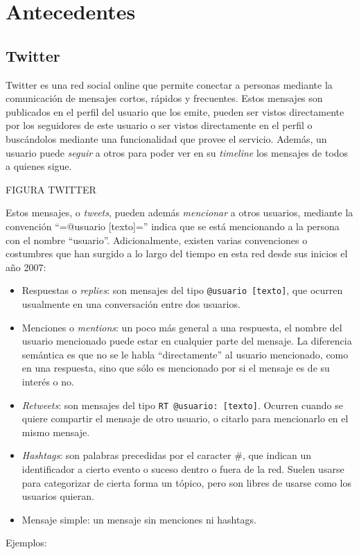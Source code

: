 \chapter{Antecedentes}
\label{sec-2}

\section{Twitter}
\label{sec-2.1}

Twitter es una red social online que permite conectar a
personas mediante la comunicación de mensajes cortos, rápidos y frecuentes. Estos
mensajes son publicados en el perfil del usuario que los emite, pueden
ser vistos directamente por los seguidores de este usuario o ser
vistos directamente en el perfil o buscándolos mediante una
funcionalidad que provee el servicio. Además, un usuario puede
\emph{seguir} a otros para poder ver en su \emph{timeline} los mensajes de todos
a quienes sigue.

FIGURA TWITTER

Estos mensajes, o \emph{tweets}, pueden además \emph{mencionar} a otros
usuarios, mediante la convención ``=@usuario [texto]='' indica que
se está mencionando a la persona con el nombre ``usuario''. Adicionalmente,
existen varias convenciones o costumbres que han surgido a lo largo
del tiempo en esta red desde sus inicios el año 2007:


\begin{itemize}
\item Respuestas o \emph{replies}: son mensajes del tipo \texttt{@usuario [texto]},
  que ocurren usualmente en una conversación entre dos usuarios.
\item Menciones o \emph{mentions}: un poco más general a una respuesta, el
  nombre del usuario mencionado puede estar en cualquier parte del
  mensaje. La diferencia semántica es que no se le habla
  ``directamente'' al usuario mencionado, como en una respuesta, sino
  que sólo es mencionado por si el mensaje es de su interés o no.
\item \emph{Retweets}: son mensajes del tipo \texttt{RT @usuario: [texto]}. Ocurren
  cuando se quiere compartir el mensaje de otro usuario, o citarlo
  para mencionarlo en el mismo mensaje.
\item \emph{Hashtags}: son palabras precedidas por el caracter \#, que indican
  un identificador a cierto evento o suceso dentro o fuera de la
  red. Suelen usarse para categorizar de cierta forma un tópico, pero
  son libres de usarse como los usuarios quieran.
\item Mensaje simple: un mensaje sin menciones ni hashtags.
\end{itemize}
Ejemplos:

